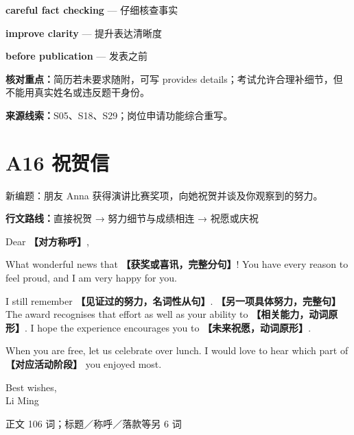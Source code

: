 \documentclass[11pt,a4paper,fontset=macnew]{ctexart}
\newenvironment{writing}{\begingroup\fontsize{10.5}{13.5}\selectfont\setlength{\parskip}{3pt}}{\par\endgroup}
\begin{document}
{\small\textbf{careful fact checking} — 仔细核查事实}\par
{\small\textbf{improve clarity} — 提升表达清晰度}\par
{\small\textbf{before publication} — 发表之前}\par
{\small\textbf{核对重点：}简历若未要求随附，可写 provides details；考试允许合理补细节，但不能用真实姓名或违反题干身份。}\par
{\fontsize{8}{10}\selectfont\textbf{来源线索：}S05、S18、S29；岗位申请功能综合重写。}\par
\clearpage\section*{A16  祝贺信}
{\small 新编题：朋友 Anna 获得演讲比赛奖项，向她祝贺并谈及你观察到的努力。}\par
{\small\textbf{行文路线：}直接祝贺 → 努力细节与成绩相连 → 祝愿或庆祝}\par
\par\vspace{4pt}{\bfseries 可替换模板}\par\nopagebreak
\begin{writing}
\noindent Dear {\bfseries 【对方称呼】},\par
What wonderful news that {\bfseries 【获奖或喜讯，完整分句】}! You have every reason to feel proud, and I am very happy for you.

I still remember {\bfseries 【见证过的努力，名词性从句】}. {\bfseries 【另一项具体努力，完整句】} The award recognises that effort as well as your ability to {\bfseries 【相关能力，动词原形】}. I hope the experience encourages you to {\bfseries 【未来祝愿，动词原形】}.

When you are free, let us celebrate over lunch. I would love to hear which part of {\bfseries 【对应活动阶段】} you enjoyed most.

\noindent Best wishes,\\Li Ming\par
\end{writing}
\par\vspace{4pt}{\bfseries 完整套用示例}\par\nopagebreak
{\small 正文 106 词；标题／称呼／落款等另 6 词}\par
\end{document}

